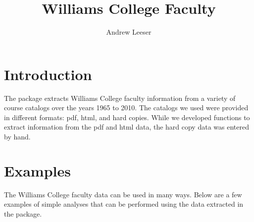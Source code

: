 \documentclass[a4paper]{report}
\begin{document}
\begin{article}

\title{Williams College Faculty}
\author{Andrew Leeser}



\maketitle



\section*{Introduction}

The  package extracts Williams College faculty
information from a variety of course catalogs over the years 1965 to
2010. The catalogs we used were provided in different formats: pdf,
html, and hard copies. While we developed functions to extract
information from the pdf and html data, the hard copy data was entered
by hand.

\section*{Examples}

The Williams College faculty data can be used in many ways. Below are
a few examples of simple analyses that can be performed using the
data extracted in the  package.



\end{article}
\end{document}
